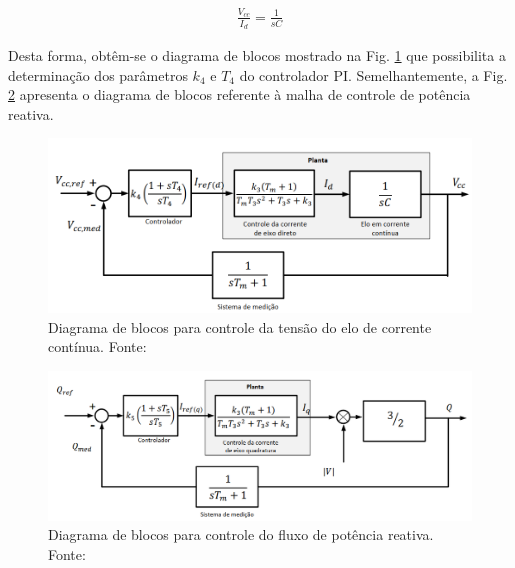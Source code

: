 \begin{align}\label{eq:funcao_transf_barramento_cc}
	\frac{V_{cc}}{I_d} = \frac{1}{sC}
\end{align}

Desta forma, obtêm-se o diagrama de blocos mostrado na Fig. \ref{fig:Diagrama_blocos_malha_externa} que possibilita a determinação dos parâmetros $k_4$ e $T_4$ do controlador PI. Semelhantemente, a Fig. \ref{fig:Diagrama_blocos_malha_externa_reativa} apresenta o diagrama de blocos referente à malha de controle de potência reativa.

\begin{figure}[!hbt]
	\begin{center}
		\includegraphics[width=\columnwidth]{figuras/Diagram_Blocos_Malha_Externa.PNG}
		\caption{Diagrama de blocos para controle da tensão do elo de corrente contínua. Fonte: \cite{TeseProfAlex}}
		\label{fig:Diagrama_blocos_malha_externa}
	\end{center}
\end{figure}

\begin{figure}[!hbt]
	\begin{center}
		\includegraphics[width=\columnwidth]{figuras/Diagram_Blocos_Malha_Externa_Reativa.PNG}
		\caption{Diagrama de blocos para controle do fluxo de potência reativa. Fonte: \cite{TeseProfAlex}}
		\label{fig:Diagrama_blocos_malha_externa_reativa}
	\end{center}
\end{figure}


